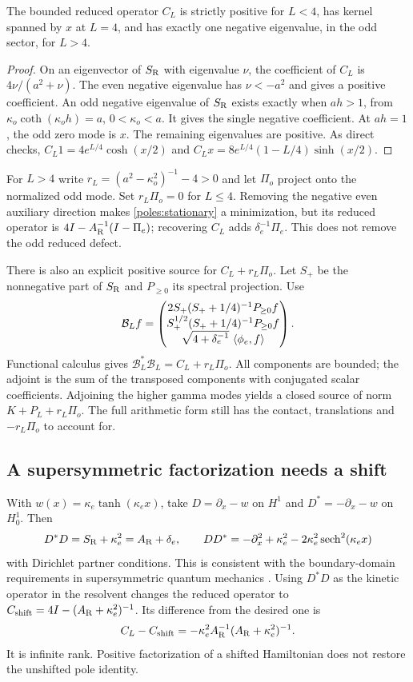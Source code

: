 \begin{proposition}\label{poles:threshold}
The bounded reduced operator $C_L$ is strictly positive for
$L<4$, has kernel spanned by $x$ at $L=4$, and has exactly one
negative eigenvalue, in the odd sector, for $L>4$.
\end{proposition}
\begin{proof}
On an eigenvector of $S_{\rm R}$ with eigenvalue $\nu$, the
coefficient of $C_L$ is $4\nu/(a^2+\nu)$.
The even negative eigenvalue has $\nu<-a^2$ and gives a positive
coefficient. An odd negative eigenvalue of $S_{\rm R}$ exists
exactly when $ah>1$, from
$\kappa_o\coth(\kappa_oh)=a$, $0<\kappa_o<a$.
It gives the single negative coefficient. At $ah=1$, the odd
zero mode is $x$. The remaining eigenvalues are positive.
As direct checks,
$C_L1=4e^{L/4}\cosh(x/2)$ and
$C_Lx=8e^{L/4}(1-L/4)\sinh(x/2)$.
\end{proof}
For $L>4$ write
$r_L=(a^2-\kappa_o^2)^{-1}-4>0$ and let $\Pi_o$ project onto the
normalized odd mode. Set $r_L\Pi_o=0$ for $L\le4$.
Removing the negative even auxiliary direction makes
\eqref{poles:stationary} a minimization, but its reduced operator
is $4I-A_{\rm R}^{-1}(I-\Pi_e)$; recovering $C_L$ adds
$\delta_e^{-1}\Pi_e$. This does not remove the odd reduced defect.

There is also an explicit positive source for $C_L+r_L\Pi_o$.
Let $S_+$ be the nonnegative part of $S_{\rm R}$ and $P_{\ge0}$
its spectral projection. Use
\[
\mathcal B_Lf=
\begin{pmatrix}
2S_+(S_++1/4)^{-1}P_{\ge0}f\\
S_+^{1/2}(S_++1/4)^{-1}P_{\ge0}f\\
\sqrt{4+\delta_e^{-1}}\,\left\langle\phi_e,f\right\rangle
\end{pmatrix}.
\]
Functional calculus gives
$\mathcal B_L^*\mathcal B_L=C_L+r_L\Pi_o$.
All components are bounded; the adjoint is the sum of the
transposed components with conjugated scalar coefficients.
Adjoining the higher gamma modes yields a closed source of norm
$K+P_L+r_L\Pi_o$. The full arithmetic form still has the
contact, translations and $-r_L\Pi_o$ to account for.

\subsection{A supersymmetric factorization needs a shift}
With $w(x)=\kappa_e\tanh(\kappa_ex)$, take
$D=\partial_x-w$ on $H^1$ and
$D^*=-\partial_x-w$ on $H_0^1$. Then
\[
D^*D=S_{\rm R}+\kappa_e^2=A_{\rm R}+\delta_e,\qquad
DD^*=-\partial_x^2+\kappa_e^2
          -2\kappa_e^2\operatorname{sech}^2(\kappa_ex)
\]
with Dirichlet partner conditions. This is consistent with the
boundary-domain requirements in supersymmetric quantum mechanics
\cite{BoundarySUSY}. Using $D^*D$ as the kinetic operator in the
resolvent changes the reduced operator to
$C_{\rm shift}=4I-(A_{\rm R}+\kappa_e^2)^{-1}$.
Its difference from the desired one is
\[
C_L-C_{\rm shift}
 =-\kappa_e^2 A_{\rm R}^{-1}(A_{\rm R}+\kappa_e^2)^{-1}.
\]
It is infinite rank. Positive factorization of a shifted
Hamiltonian does not restore the unshifted pole identity.

